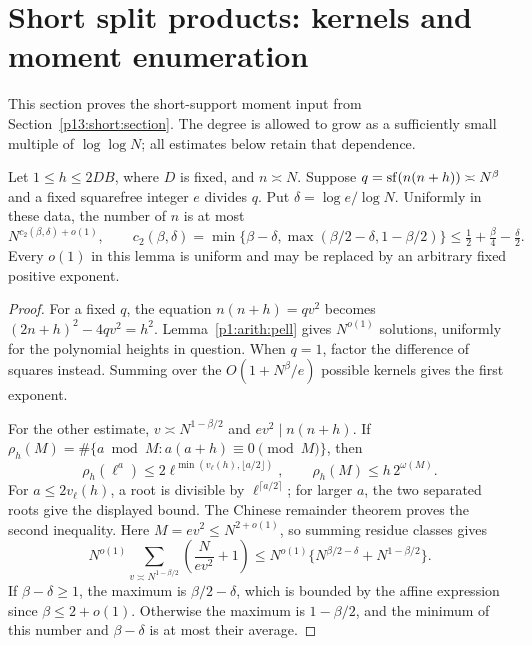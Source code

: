\section{Short split products: kernels and moment enumeration}
\label{p14:comp:short}

This section proves the short-support moment input from
Section~\ref{p13:short:section}.  The degree is allowed to grow as a
sufficiently small multiple of $\log\log N$; all estimates below
retain that dependence.

\begin{lemma}
\label{p13:short:quadratic}
Let \(1\le h\le2DB\), where \(D\) is fixed, and \(n\asymp N\).
Suppose \(q=\sf(n(n+h))\asymp N^\beta\) and a fixed squarefree
integer \(e\) divides \(q\). Put \(\delta=\log e/\log N\).
Uniformly in these data, the number of \(n\) is at most
\[
 N^{c_2(\beta,\delta)+o(1)},\qquad
 c_2(\beta,\delta)=
 \min\{\beta-\delta,\max(\beta/2-\delta,1-\beta/2)\}
 \le \tfrac12+\tfrac\beta4-\tfrac\delta2.
\]
Every \(o(1)\) in this lemma is uniform and may be replaced
by an arbitrary fixed positive exponent.
\end{lemma}

\begin{proof}
For a fixed \(q\), the equation \(n(n+h)=qv^2\) becomes
\((2n+h)^2-4qv^2=h^2\). Lemma~\ref{p1:arith:pell}
gives \(N^{o(1)}\) solutions, uniformly for the polynomial
heights in question. When \(q=1\), factor the difference of
squares instead. Summing over the \(O(1+N^\beta/e)\)
possible kernels gives the first exponent.

For the other estimate, \(v\asymp N^{1-\beta/2}\) and
\(ev^2\mid n(n+h)\). If
\(\rho_h(M)=\#\{a\bmod M:a(a+h)\equiv0\pmod M\}\), then
\[
 \rho_h(\ell^a)
 \le2\ell^{\min(v_\ell(h),\lfloor a/2\rfloor)},\qquad
 \rho_h(M)\le h\,2^{\omega(M)}.
\]
For \(a\le2v_\ell(h)\), a root is divisible by
\(\ell^{\lceil a/2\rceil}\); for larger \(a\), the two
separated roots give the displayed bound. The Chinese
remainder theorem proves the second inequality. Here
\(M=ev^2\le N^{2+o(1)}\), so summing residue classes gives
\[
 N^{o(1)}
 \sum_{v\asymp N^{1-\beta/2}}\left(\frac{N}{ev^2}+1\right)
 \le N^{o(1)}
       \{N^{\beta/2-\delta}+N^{1-\beta/2}\}.
\]
If \(\beta-\delta\ge1\), the maximum is
\(\beta/2-\delta\), which is bounded by the affine expression
since \(\beta\le2+o(1)\). Otherwise the maximum is
\(1-\beta/2\), and the minimum of this number and
\(\beta-\delta\) is at most their average.
\end{proof}

